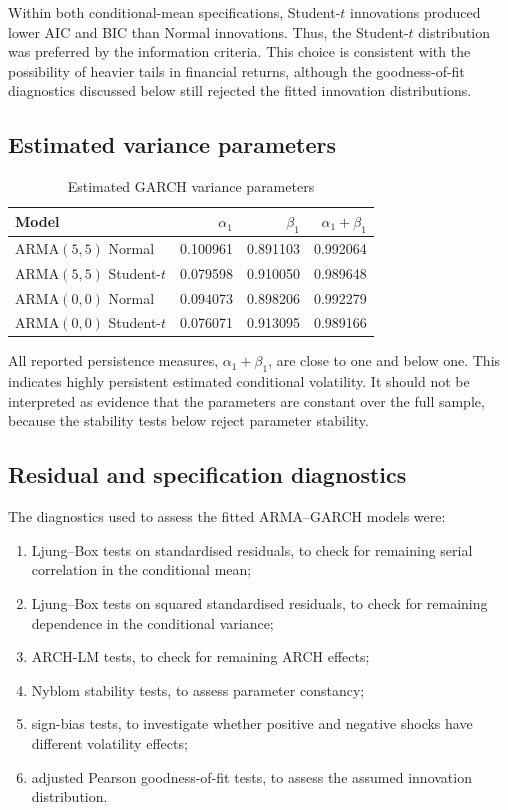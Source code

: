 \documentclass[10pt,a4paper]{article}
\begin{document}
Within both conditional-mean specifications, Student-$t$ innovations produced lower AIC and BIC than Normal innovations. Thus, the Student-$t$ distribution was preferred by the information criteria. This choice is consistent with the possibility of heavier tails in financial returns, although the goodness-of-fit diagnostics discussed below still rejected the fitted innovation distributions.

\subsection{Estimated variance parameters}

\begin{table}[H]
\centering
\caption{Estimated GARCH variance parameters}
\begin{tabular}{lrrr}
\toprule
Model & $\alpha_1$ & $\beta_1$ & $\alpha_1+\beta_1$ \\
\midrule
ARMA$(5,5)$ Normal & 0.100961 & 0.891103 & 0.992064 \\
ARMA$(5,5)$ Student-$t$ & 0.079598 & 0.910050 & 0.989648 \\
ARMA$(0,0)$ Normal & 0.094073 & 0.898206 & 0.992279 \\
ARMA$(0,0)$ Student-$t$ & 0.076071 & 0.913095 & 0.989166 \\
\bottomrule
\end{tabular}
\label{tab:garch_parameters}
\end{table}

All reported persistence measures, $\alpha_1+\beta_1$, are close to one and below one. This indicates highly persistent estimated conditional volatility. It should not be interpreted as evidence that the parameters are constant over the full sample, because the stability tests below reject parameter stability.

\subsection{Residual and specification diagnostics}

The diagnostics used to assess the fitted ARMA--GARCH models were:
\begin{enumerate}[leftmargin=2em]
  \item Ljung--Box tests on standardised residuals, to check for remaining serial correlation in the conditional mean;
  \item Ljung--Box tests on squared standardised residuals, to check for remaining dependence in the conditional variance;
  \item ARCH-LM tests, to check for remaining ARCH effects;
  \item Nyblom stability tests, to assess parameter constancy;
  \item sign-bias tests, to investigate whether positive and negative shocks have different volatility effects;
  \item adjusted Pearson goodness-of-fit tests, to assess the assumed innovation distribution.
\end{enumerate}
\end{document}
